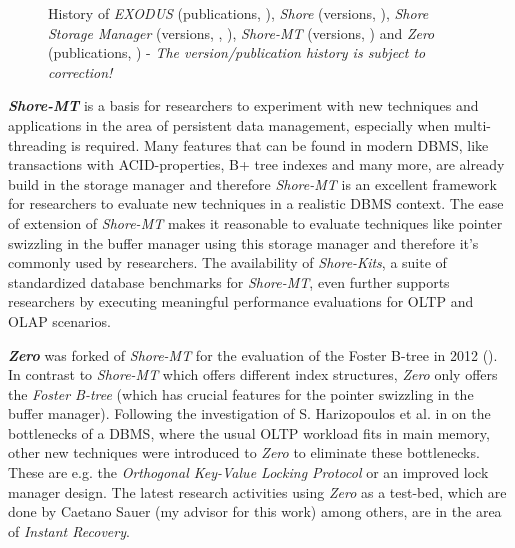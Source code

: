 \begin{figure}[ht!]
{
		}
		\caption{History of \emph{EXODUS} (publications, \cite{EXODUSPapers}), \emph{Shore} (versions, \cite{ShoreReleases}), \emph{Shore Storage Manager} (versions, \cite{ShoreReleases}, \cite{ShoreSMReleases}), \emph{Shore-MT} (versions, \cite{ShoreMTReleases}) and \emph{Zero} (publications, \cite{ZeroPapers}) - \textit{The version/publication history is subject to correction!}}
		\label{fig:testbedhistory}
	\end{figure}

	\textbf{\emph{Shore-MT}} is a basis for researchers to experiment with new techniques and applications in the area of persistent data management, especially when multi-threading is required. Many features that can be found in modern DBMS, like transactions with ACID-properties, B+ tree indexes and many more, are already build in the storage manager and therefore \emph{Shore-MT} is an excellent framework for researchers to evaluate new techniques in a realistic DBMS context. The ease of extension of \emph{Shore-MT} makes it reasonable to evaluate techniques like pointer swizzling in the buffer manager using this storage manager and therefore it's commonly used by researchers. The availability of \emph{Shore-Kits}, a suite of standardized database benchmarks for \emph{Shore-MT}, even further supports researchers by executing meaningful performance evaluations for OLTP and OLAP scenarios.
	
	\textbf{\emph{Zero}} was forked of \emph{Shore-MT} for the evaluation of the Foster B-tree in 2012 (\cite{Graefe:2012}). In contrast to \emph{Shore-MT} which offers different index structures, \emph{Zero} only offers the \emph{Foster B-tree} (which has crucial features for the pointer swizzling in the buffer manager). Following the investigation of S. Harizopoulos et al. in \cite{Harizopoulos:2008} on the bottlenecks of a DBMS, where the usual OLTP workload fits in main memory, other new techniques were introduced to \emph{Zero} to eliminate these bottlenecks. These are e.g. the \emph{Orthogonal Key-Value Locking Protocol} or an improved lock manager design. The latest research activities using \emph{Zero} as a test-bed, which are done by Caetano Sauer (my advisor for this work) among others, are in the area of \emph{Instant Recovery}.
	
